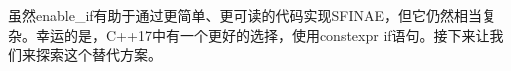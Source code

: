 虽然enable\_if有助于通过更简单、更可读的代码实现SFINAE，但它仍然相当复杂。幸运的是，C++17中有一个更好的选择，使用constexpr if语句。接下来让我们来探索这个替代方案。


































